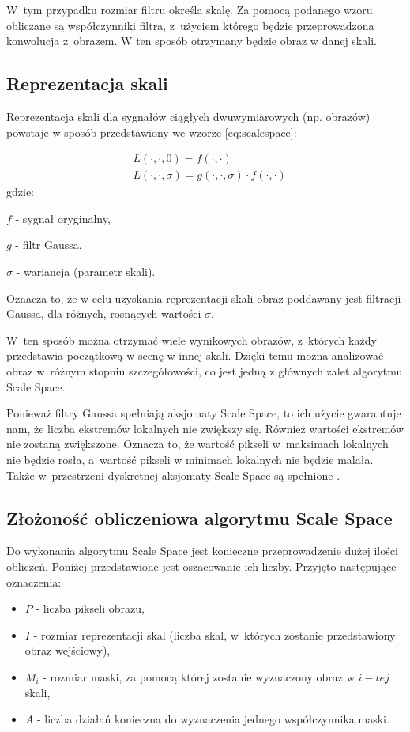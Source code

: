 W~tym przypadku rozmiar filtru określa skalę. Za pomocą podanego wzoru obliczane są współczynniki filtra, z~użyciem którego będzie przeprowadzona konwolucja z~obrazem. W ten sposób otrzymany będzie obraz w danej skali.

\subsection{Reprezentacja skali}
\label{subsec:reprezentacjaskali}
Reprezentacja skali dla sygnałów ciągłych dwuwymiarowych (np. obrazów) powstaje w sposób przedstawiony we wzorze \ref{eq:scalespace}:

\begin{equation}
\label{eq:scalespace}
\begin{split}
& L(\cdot,\cdot,0) = f(\cdot,\cdot) \\
& L(\cdot,\cdot,\sigma) = g(\cdot,\cdot,\sigma)\cdot f(\cdot,\cdot)
\end{split}
\end{equation}
gdzie:

$ f $ - sygnał oryginalny,

$ g $ - filtr Gaussa, 

$ \sigma $ - wariancja (parametr skali).

Oznacza to, że w celu uzyskania reprezentacji skali obraz poddawany jest filtracji Gaussa, dla różnych, rosnących wartości $ \sigma $.

W~ten sposób można otrzymać wiele wynikowych obrazów, z~których każdy przedstawia początkową w scenę w innej skali. Dzięki temu można analizować obraz w~różnym stopniu szczegółowości, co jest jedną z głównych zalet algorytmu Scale Space.

Ponieważ filtry Gaussa spełniają aksjomaty Scale Space, to ich użycie gwarantuje nam, że liczba ekstremów lokalnych nie zwiększy się. Również wartości ekstremów nie zostaną zwiększone. Oznacza to, że wartość pikseli w~maksimach lokalnych nie będzie rosła, a~wartość pikseli w minimach lokalnych nie będzie malała. Także w~przestrzeni dyskretnej aksjomaty Scale Space są spełnione \cite{SSFDS}.

\subsection{Złożoność obliczeniowa algorytmu Scale Space}
\label{subsec:zlozonosc_obliczeniowa}

Do wykonania algorytmu Scale Space jest konieczne przeprowadzenie dużej ilości obliczeń. Poniżej przedstawione jest oszacowanie ich liczby. Przyjęto następujące oznaczenia:
\begin{itemize}
\item $ P $ - liczba pikseli obrazu,
\item $ I $ - rozmiar reprezentacji skal (liczba skal, w~których zostanie przedstawiony obraz wejściowy),
\item $ M_i $ - rozmiar maski, za pomocą której zostanie wyznaczony obraz w $ i-tej $ skali,
\item $ A $ - liczba działań konieczna do wyznaczenia jednego współczynnika maski.
\end{itemize}

